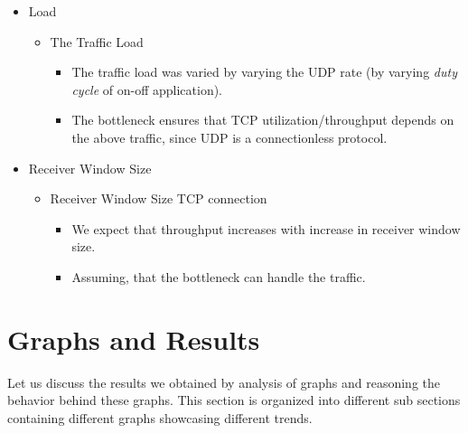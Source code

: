 \documentclass[paper=a4, fontsize=12pt]{scrartcl} %
\numberwithin{equation}{section} %
\numberwithin{figure}{section} %
\numberwithin{table}{section} %
\begin{document}
\begin{itemize}
	\item Load
		\begin{itemize}
		\item The Traffic Load 
			\begin{itemize}
			\item The traffic load was varied by varying the UDP rate (by varying \emph{duty cycle} of on-off application).
			\item The bottleneck ensures that TCP utilization/throughput depends on the above traffic, since UDP is a connectionless protocol.
			\end{itemize}
		\end{itemize}
	\item Receiver Window Size
		\begin{itemize}
		\item Receiver Window Size TCP connection
			\begin{itemize}
			\item We expect that throughput increases with increase in receiver window size.
			\item Assuming, that the bottleneck can handle the traffic.
			\end{itemize}
		\end{itemize}
\end{itemize}



\section{Graphs and Results}
%


Let us discuss the results we obtained by analysis of graphs and reasoning the behavior behind these graphs. This section is organized into different sub sections containing different graphs showcasing different trends.
\end{document}
